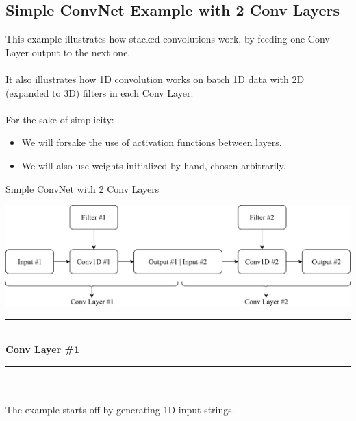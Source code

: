 \documentclass[a4paper, 12pt]{report}
\newcommand\tab[1][1cm]{\hspace*{#1}}
\begin{document}
\subsection{\textbf{Simple ConvNet Example with 2 Conv Layers}}
This example illustrates how stacked convolutions work, by feeding one Conv Layer output to the next one.\\\\
It also illustrates how 1D convolution works on batch 1D data with 2D (expanded to 3D) filters in each Conv Layer.\\\\
For the sake of simplicity:
\begin{itemize}
	\item We will forsake the use of activation functions between layers.
	\item We will also use weights initialized by hand, chosen arbitrarily.
\end{itemize}
\vspace{0.25\textheight}
\begin{blockfigure}{Simple ConvNet with 2 Conv Layers}
	\begin{center}
		\includegraphics[width=\textwidth]{convLayerExample}
	\end{center}
\end{blockfigure}
\newpage
	{
		
		\color{blue-primary-alt} 
		\rule{2.1cm}{0.4mm}\\[0.2cm]
		\textbf{Conv Layer \#1}\\
		\rule{2.1cm}{0.4mm}
	}\\\\
\tab The example starts off by generating 1D input strings.\\
\end{document}
